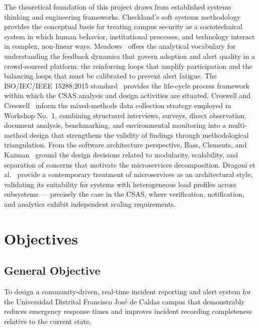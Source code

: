 \documentclass[12pt, oneside]{article}
\begin{document}
The theoretical foundation of this project draws from established systems thinking and
engineering frameworks. Checkland's soft systems methodology~\cite{checkland1981}
provides the conceptual basis for treating campus security as a sociotechnical system
in which human behavior, institutional processes, and technology interact in complex,
non-linear ways. Meadows~\cite{meadows2008} offers the analytical vocabulary for
understanding the feedback dynamics that govern adoption and alert quality in a
crowd-sourced platform: the reinforcing loops that amplify participation and the
balancing loops that must be calibrated to prevent alert fatigue. The ISO/IEC/IEEE
15288:2015 standard~\cite{iso15288} provides the life-cycle process framework within
which the CSAS analysis and design activities are situated. Creswell and
Creswell~\cite{creswell2018} inform the mixed-methods data collection strategy
employed in Workshop No.~1, combining structured interviews, surveys, direct
observation, document analysis, benchmarking, and environmental monitoring into a
multi-method design that strengthens the validity of findings through methodological
triangulation. From the software architecture perspective, Bass, Clements, and
Kazman~\cite{bass2013} ground the design decisions related to modularity, scalability,
and separation of concerns that motivate the microservices decomposition. Dragoni et
al.~\cite{dragoni2017} provide a contemporary treatment of microservices as an
architectural style, validating its suitability for systems with heterogeneous load
profiles across subsystems --- precisely the case in the CSAS, where verification,
notification, and analytics exhibit independent scaling requirements.

\section{Objectives}

\subsection{General Objective}

To design a community-driven, real-time incident reporting and alert system for the
Universidad Distrital Francisco Jos\'e de Caldas campus that demonstrably reduces
emergency response times and improves incident recording completeness relative to the
current state.
\end{document}
